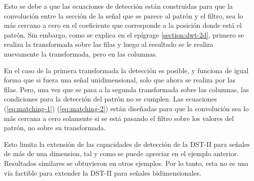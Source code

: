 Esto se debe a que las ecuaciones de detección están 
construidas para que la convolución entre la sección de la señal que se parece al patrón y 
el filtro, sea lo más cercano a cero en el coeficiente que corresponde a la posición donde está el patrón.
Sin embargo, como se explica en el epígrage \ref{section:dwt-2d}, primero se realiza la transformada sobre las filas y 
luego al resultado
se le realiza nuevamente la transformada, pero en las columnas. 

En el caso de la primera transformada la detección es posible, y funciona de igual forma que si fuera una señal
unidimensional, solo que ahora se realiza por las filas. 
Pero, una vez que se pasa a la segunda transformada sobre las columnas, las condiciones para la detección del patrón no se cumplen.
Las ecuaciones (\ref{eq:matching-1}) (\ref{eq:matching-2}) están diseñadas para que la convolución sea lo más cercana 
a cero solamente si se está pasando el filtro sobre los valores del patrón, no sobre su transformada.

Esto limita la extensión de las capacidades de detección de la DST-II para señales de más de una dimension, 
tal y como se puede
apreciar en el ejemplo anterior. Resultados similares se obtuvieron en otros ejemplos. Por lo tanto, esta no es una 
vía factible para extender la DST-II para señales bidimensionales.



